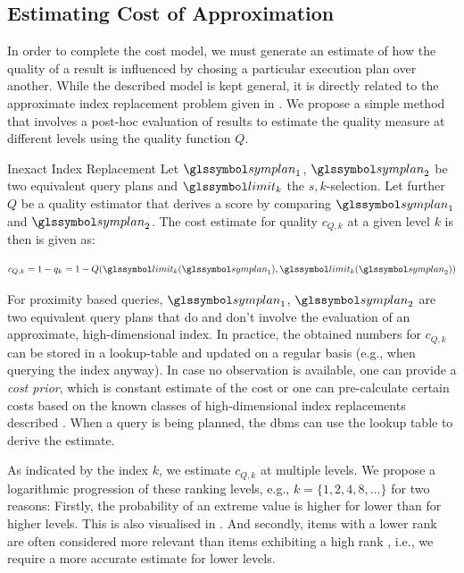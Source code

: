\subsection{Estimating Cost of Approximation}
\label{section:quality_cost_estimation}

In order to complete the cost model, we must generate an estimate of how the quality of a result is influenced by chosing a particular execution plan over another. While the described model is kept general, it is directly related to the approximate index replacement problem given in . We propose a simple method that involves a post-hoc evaluation of results to estimate the quality measure at different levels using the quality function $Q$.

\begin{definition}[label=definition:cost_estimation_quality]{Inexact Index Replacement}{}
    Let $\symplan_1$, $\symplan_2$ be two equivalent query plans and $\limit_k$ the $s,k$-selection. Let further $Q$ be a quality estimator that derives a score by comparing $\symplan_1$ and $\symplan_2$. The cost estimate for quality $c_{Q,k}$ at a given level $k$ is then is given as:
    
    \begin{equation*}
        c_{Q,k} = 1 - q_k = 1 - Q(\limit_k(\symplan_1),\limit_k(\symplan_2))
    \end{equation*}
\end{definition}

For proximity based queries, $\symplan_1$, $\symplan_2$ are two equivalent query plans that do and don't involve the evaluation of an approximate, high-dimensional index. In practice, the obtained numbers for $c_{Q,k}$ can be stored in a lookup-table and updated on a regular basis (e.g., when querying the index anyway). In case no observation is available, one can provide a \emph{cost prior}, which is constant estimate of the cost or one can pre-calculate certain costs based on the known classes of high-dimensional index replacements described . When a query is being planned, the \acrshort{dbms} can use the lookup table to derive the estimate.

As indicated by the index $k$, we estimate $c_{Q,k}$ at multiple levels. We propose a logarithmic progression of these ranking levels, e.g., $k= \{ 1, 2, 4, 8, \ldots \}$ for two reasons: Firstly, the probability of an extreme value is higher for lower than for higher levels. This is also visualised in . And secondly, items with a lower rank are often considered more relevant than items exhibiting a high rank \cite{Jarvelin:2002Cumulated}, i.e., we require a more accurate estimate for lower levels.

